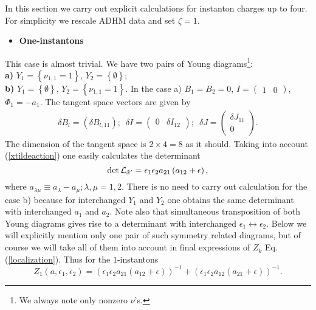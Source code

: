 \documentclass[a4paper,12pt]{article}
\begin{document}
In this section we carry out explicit calculations for instanton charges up to four. For simplicity we rescale
ADHM data and set $\zeta=1$.
\begin{itemize}
\item {\bf One-instantons} \end{itemize}
This case is almost trivial. We have two pairs of Young diagrams\footnote{We always note only nonzero $\nu$'s.}: \\
{\bf a)} $Y_1=\left\{\nu_{1,1}=1\right\}$, $Y_2=\left\{\emptyset\right\}$; \\
{\bf b)} $Y_1=\left\{\emptyset\right\}$,
$Y_2=\left\{\nu_{1,1}=1\right\}$. In the case a) $B_1=B_2=0$,
$I=\left(\begin{array}{cc}1 & 0 \end{array}\right)$,
$\Phi_1=-a_1$. The tangent space vectors are given by
\begin{eqnarray}
\delta B_l=\left(\delta B_{l,11}\right); \, \, \,
\delta I=\left(
\begin{array}{cc} 0 & \delta I_{12}
\end{array}\right);
\, \, \,
\delta J=\left(
\begin{array}{c}
\delta J_{11} \\
0
\end{array}\right).
\end{eqnarray}
The dimension of the tangent space is $2\times 4=8$ as it should. Taking into account (\ref{xtildeaction}) one
easily calculates the determinant
\begin{equation}
\det {\cal L}_{{\tilde x}'}=\epsilon_1 \epsilon_2 a_{21}
\left(a_{12}+\epsilon \right),
\end{equation}
where $a_{\lambda \mu}\equiv a_{\lambda}-a_{\mu}; \lambda , \mu
=1,2$. There is no need to carry out calculation for the case b)
because for interchanged $Y_1$ and $Y_2$ one obtains the same
determinant with interchanged $a_1$ and $a_2$. Note also that
simultaneous transposition of both Young diagrams gives rise to a
determinant with interchanged $\epsilon_1 \leftrightarrow
\epsilon_2$. Below we will explicitly mention only one pair of
such symmetry related diagrams, but of course we will take all of
them into account in final expressions of $Z_k$ Eq.
(\ref{localization}). Thus for the $1$-instantons
\begin{equation}
Z_1\left(a, \epsilon_1, \epsilon_2 \right)=\left(\epsilon_1 \epsilon_2 a_{21} \left(a_{12}+\epsilon
\right)\right)^{-1}+\left(\epsilon_1 \epsilon_2 a_{12} \left(a_{21}+\epsilon \right)\right)^{-1}.
\end{equation}
\end{document}
